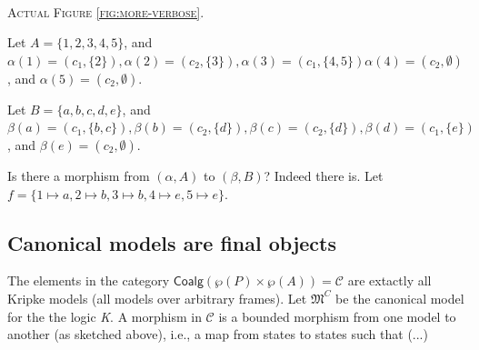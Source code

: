 \begin{minipage}[b]{0.3\linewidth}
\begin{center}
\\
\textsc{Actual Figure \ref{fig:more-verbose}. } 
\end{center}
\end{minipage}


Let $A = \{1, 2, 3, 4, 5\}$, and $\alpha(1) = (c_1, \{2\}), \alpha(2) = (c_2, \{3\}), \alpha(3) = (c_1, \{4, 5\}) \alpha(4) = (c_2, \emptyset)$, and $\alpha(5) = (c_2, \emptyset)$.

Let $B = \{a, b, c, d, e\}$, and $\beta(a) = (c_1, \{b, c\}), \beta(b) = (c_2, \{d\}), \beta(c) = (c_2, \{d\}), \beta(d) = (c_1, \{e\})$, and $\beta(e) = (c_2, \emptyset)$.

Is there a morphism from $(\alpha, A)$ to $(\beta, B)$? Indeed there is. Let $f = \{1 \mapsto a, 2 \mapsto b, 3 \mapsto b, 4 \mapsto e, 5 \mapsto e\}$.



\subsection{Canonical models are final objects}
The elements in the category $\mathsf{Coalg}(\wp(P)\times\wp(A)) = \mathcal C$ are extactly all Kripke models (all models over arbitrary frames). Let $\mathfrak M^C$ be the canonical model for the the logic \textit{K}. A morphism in $\mathcal C$ is a bounded morphism from one model to another (as sketched above), i.e., a map from states to states such that (...)

